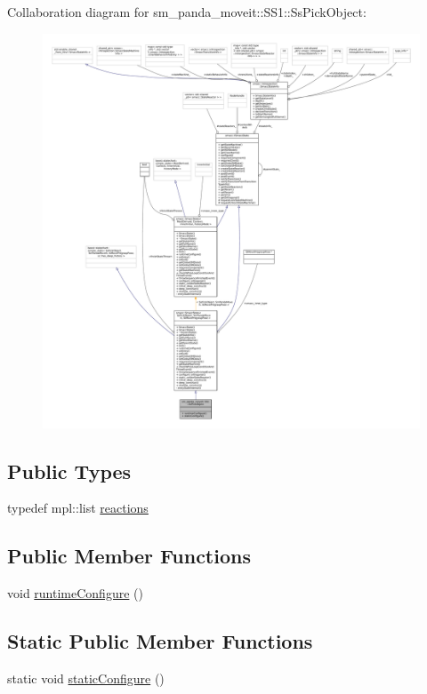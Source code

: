 Collaboration diagram for sm\+\_\+panda\+\_\+moveit\+:\+:S\+S1\+:\+:Ss\+Pick\+Object\+:
\nopagebreak
\begin{figure}[H]
\begin{center}
\leavevmode
\includegraphics[width=350pt]{structsm__panda__moveit_1_1SS1_1_1SsPickObject__coll__graph}
\end{center}
\end{figure}
\subsection*{Public Types}
\begin{DoxyCompactItemize}
\item 
typedef mpl\+::list \hyperlink{structsm__panda__moveit_1_1SS1_1_1SsPickObject_a6b133003089ea0c92f78541efe41c29b}{reactions}
\end{DoxyCompactItemize}
\subsection*{Public Member Functions}
\begin{DoxyCompactItemize}
\item 
void \hyperlink{structsm__panda__moveit_1_1SS1_1_1SsPickObject_aaa13d9e51c20373bf1d8cfac5164d05e}{runtime\+Configure} ()
\end{DoxyCompactItemize}
\subsection*{Static Public Member Functions}
\begin{DoxyCompactItemize}
\item 
static void \hyperlink{structsm__panda__moveit_1_1SS1_1_1SsPickObject_a5fea44f39f59c7ef9db5769415bd8afc}{static\+Configure} ()
\end{DoxyCompactItemize}
